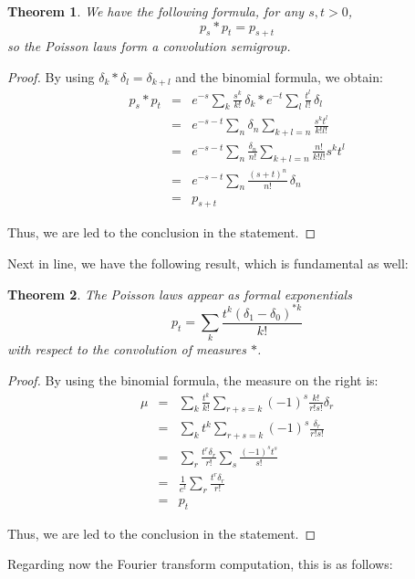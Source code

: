 \documentclass[12pt]{amsbook}
\newtheorem{theorem}{Theorem}[chapter]
\begin{document}

\begin{theorem}
We have the following formula, for any $s,t>0$,
$$p_s*p_t=p_{s+t}$$
so the Poisson laws form a convolution semigroup.
\end{theorem}

\begin{proof}
By using $\delta_k*\delta_l=\delta_{k+l}$ and the binomial formula, we obtain:
\begin{eqnarray*}
p_s*p_t
&=&e^{-s}\sum_k\frac{s^k}{k!}\,\delta_k*e^{-t}\sum_l\frac{t^l}{l!}\,\delta_l\\
&=&e^{-s-t}\sum_n\delta_n\sum_{k+l=n}\frac{s^kt^l}{k!l!}\\
&=&e^{-s-t}\sum_n\frac{\delta_n}{n!}\sum_{k+l=n}\frac{n!}{k!l!}s^kt^l\\\
&=&e^{-s-t}\sum_n\frac{(s+t)^n}{n!}\,\delta_n\\
&=&p_{s+t}
\end{eqnarray*}

Thus, we are led to the conclusion in the statement.
\end{proof}

Next in line, we have the following result, which is fundamental as well:


\begin{theorem}
The Poisson laws appear as formal exponentials
$$p_t=\sum_k\frac{t^k(\delta_1-\delta_0)^{*k}}{k!}$$
with respect to the convolution of measures $*$.
\end{theorem}

\begin{proof}
By using the binomial formula, the measure on the right is:
\begin{eqnarray*}
\mu
&=&\sum_k\frac{t^k}{k!}\sum_{r+s=k}(-1)^s\frac{k!}{r!s!}\delta_r\\
&=&\sum_kt^k\sum_{r+s=k}(-1)^s\frac{\delta_r}{r!s!}\\
&=&\sum_r\frac{t^r\delta_r}{r!}\sum_s\frac{(-1)^st^s}{s!}\\
&=&\frac{1}{e^t}\sum_r\frac{t^r\delta_r}{r!}\\
&=&p_t
\end{eqnarray*}

Thus, we are led to the conclusion in the statement.
\end{proof}

Regarding now the Fourier transform computation, this is as follows:
\end{document}
